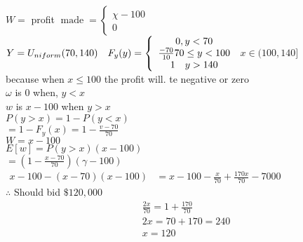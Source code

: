 \documentclass[]{article}
\begin{document}
$W=$ profit $\operatorname{made}=\left\{\begin{array}{c}\chi-100 \\ 0\end{array}\right.$
$Y=U_{n i f o r m}(70,140) \\ \quad F_y(y)=\left\{\begin{array}{c}0, y<70 \\ \frac{-70}{10} 70 \leq y<100 \\ 1 \quad y>140\end{array}\right.$
$x \in(100,140]$ \\
because when $x \leqslant 100$ the profit will. te negative or zero \\
$\omega$ is 0 when, $y<x$\\
$w$ is $x-100$ when $y>x$\\
$P(y>x)=1-P(y<x)$\\
$=1-F_y(x)=1-\frac{v-70}{70}$\\
$W=x-100$\\
$E[w]=P(y>x)(x-100)$\\
$=\left(1-\frac{x-70}{70}\right)(\gamma-100)$\\
$\begin{aligned} x-100-(x-70)(x-100) &=x-100-\frac{x}{70}+\frac{170 x}{70}-7000 \end{aligned}$\\
$\therefore$ Should bid $\$ 120,000$
$$
\begin{aligned}
&\frac{2 x}{70}=1+\frac{170}{70} \\
&2 x=70+170=240 \\
&x=120
\end{aligned}
$$
\end{document}
